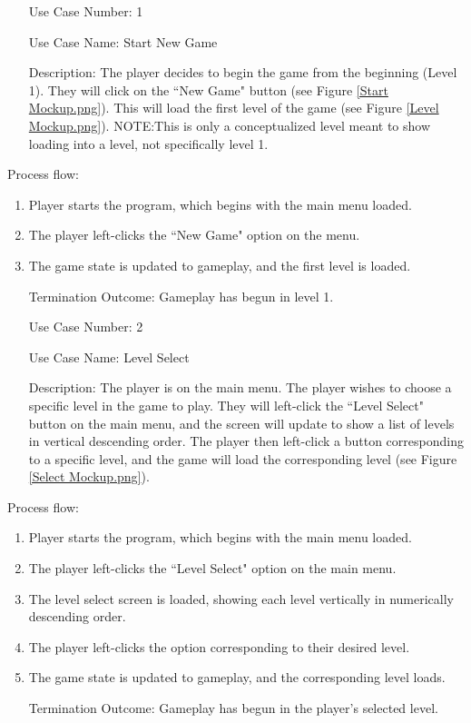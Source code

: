\documentclass[10pt,conference,onecolumn,compsoc]{IEEEtran}
\begin{document}
\begin{itemize}
\item[Use Case Number:] 1
\item[Use Case Name:] Start New Game
\item[Description:] The player decides to begin the game from the beginning (Level 1). They will click on the ``New Game" button (see Figure \ref{Start Mockup.png}). This will load the first level of the game (see Figure \ref{Level Mockup.png}). NOTE:This is only a conceptualized level meant to show loading into a level, not specifically level 1.
\end{itemize}

Process flow:

\begin{enumerate}
\item Player starts the program, which begins with the main menu loaded.
\item The player left-clicks the ``New Game" option on the menu.
\item The game state is updated to gameplay, and the first level is loaded.
\item[Termination Outcome:] Gameplay has begun in level 1.
\end{enumerate}

\begin{itemize}
\item[Use Case Number:] 2
\item[Use Case Name:] Level Select
\item[Description:] The player is on the main menu. The player wishes to choose a specific level in the game to play. They will left-click the ``Level Select" button on the main menu, and the screen will update to show a list of levels in vertical descending order. The player then left-click a button corresponding to a specific level, and the game will load the corresponding level (see Figure \ref{Select Mockup.png}).
\end{itemize}

Process flow:

\begin{enumerate}
\item Player starts the program, which begins with the main menu loaded.
\item The player left-clicks the ``Level Select" option on the main menu.
\item The level select screen is loaded, showing each level vertically in numerically descending order.
\item The player left-clicks the option corresponding to their desired level.
\item The game state is updated to gameplay, and the corresponding level loads.
\item[Termination Outcome:] Gameplay has begun in the player's selected level.
\end{enumerate}
\end{document}
